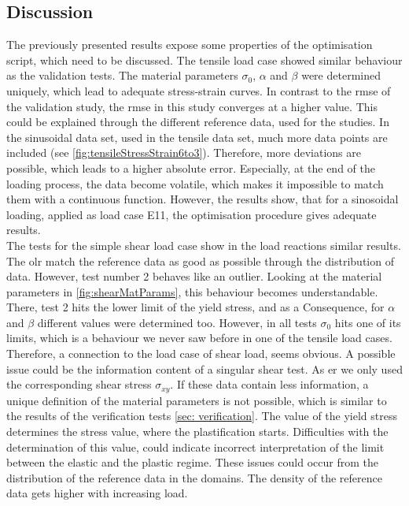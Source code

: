 \subsection{Discussion}
The previously presented results expose some properties of the optimisation script, which need to be discussed. The tensile load case showed similar behaviour as the validation tests. The material parameters $\sigma_0$, $\alpha$ and $\beta$ were determined uniquely, which lead to adequate stress-strain curves. In contrast to the \acrshort{rmse} of the validation study, the \acrshort{rmse} in this study converges at a higher value. This could be explained through the different reference data, used for the studies. In the sinusoidal data set, used in the tensile data set, much more data points are included (see \autoref{fig:tensileStressStrain6to3}).
Therefore, more deviations are possible, which leads to a higher absolute error. Especially, at the end of the loading process, the data become volatile, which makes it impossible to match them with a continuous function. However, the results show, that for a sinosoidal loading, applied as load case E11, the optimisation procedure gives adequate results. \\
The tests for the simple shear load case show in the load reactions similar results.
The \acrlong{olr} match the reference data as good as possible through the distribution of data.
However, test number 2 behaves like an outlier. Looking at the material parameters in \autoref{fig:shearMatParams}, this behaviour becomes understandable. There, test 2 hits the lower limit of the yield stress, and as a Consequence, for $\alpha$ and $\beta$ different values were determined too. However, in all tests $\sigma_0$ hits one of its limits, which is a behaviour we never saw before in one of the tensile load cases.
Therefore, a connection to the load case of shear load, seems obvious.
A possible issue could be the information content of a singular shear test. As \acrlong{er} we only used the corresponding shear stress $\sigma_{xy}$. If these data contain less information, a unique definition of the material parameters is not possible, which is similar to the results of the verification tests \autoref{sec: verification}. The value of the yield stress determines the stress value, where the plastification starts. Difficulties with the determination of this value, could indicate incorrect interpretation of the limit between the elastic and the plastic regime.
These issues could occur from the distribution of the reference data in the domains.
The density of the reference data gets higher with increasing load.
